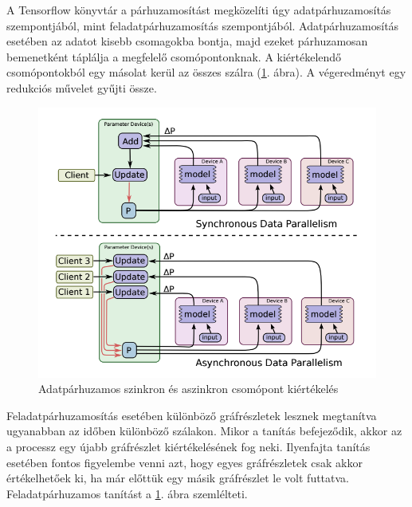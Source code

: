 \documentclass[12pt, a4paper, oneside]{book}
\theoremstyle{tetel}
\begin{document}
A Tensorflow könyvtár a párhuzamosítást megközelíti úgy adatpárhuzamosítás szempontjából, mint feladatpárhuzamosítás szempontjából. Adatpárhuzamosítás esetében az adatot kisebb csomagokba bontja, majd ezeket párhuzamosan bemenetként táplálja a megfelelő csomópontonknak. A kiértékelendő csomópontokból egy másolat kerül az összes szálra (\ref{data_parallel_tf_model}. ábra). A végeredményt egy redukciós művelet gyűjti össze.

\begin{figure}[!htbp]
	\begin{center}
		\includegraphics[scale=0.5]{data_parallel_tf_model.png}
		\caption{Adatpárhuzamos szinkron és aszinkron csomópont kiértékelés\cite{35}}
		\label{data_parallel_tf_model}
	\end{center}
\end{figure}

Feladatpárhuzamosítás esetében különböző gráfrészletek lesznek megtanítva ugyanabban az időben különböző szálakon. Mikor a tanítás befejeződik, akkor az a processz egy újabb gráfrészlet kiértékelésének fog neki. Ilyenfajta tanítás esetében fontos figyelembe venni azt, hogy egyes gráfrészletek csak akkor értékelhetőek ki, ha már előttük egy másik gráfrészlet le volt futtatva. Feladatpárhuzamos tanítást a \ref{data_parallel_tf_model}. ábra szemlélteti.
\end{document}
